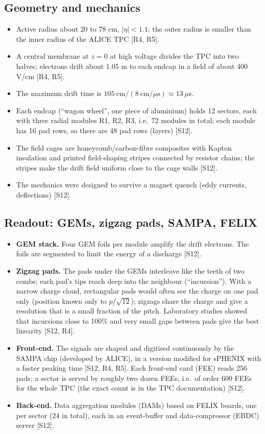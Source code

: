 \documentclass[11pt,letterpaper]{article}
\begin{document}
\subsection{Geometry and mechanics}
\begin{itemize}
\item Active radius about 20 to 78 cm, $|\eta|<1.1$; the outer radius is smaller than the inner radius of the ALICE TPC [R4, R5].
\item A central membrane at $z=0$ at high voltage divides the TPC into two halves; electrons drift about 1.05 m to each endcap in a field of about 400 V/cm [R4, R5].
\item The maximum drift time is $105\ \mathrm{cm}/(8\ \mathrm{cm}/\mu\mathrm{s})\approx13\ \mu$s.
\item Each endcap (``wagon wheel'', one piece of aluminium) holds 12 sectors, each with three radial modules R1, R2, R3, i.e.\ 72 modules in total; each module has 16 pad rows, so there are 48 pad rows (layers) [S12].
\item The field cages are honeycomb/carbon-fibre composites with Kapton insulation and printed field-shaping stripes connected by resistor chains; the stripes make the drift field uniform close to the cage walls [S12].
\item The mechanics were designed to survive a magnet quench (eddy currents, deflections) [S12].
\end{itemize}

\subsection{Readout: GEMs, zigzag pads, SAMPA, FELIX}
\begin{itemize}
\item \textbf{GEM stack.} Four GEM foils per module amplify the drift electrons. The foils are segmented to limit the energy of a discharge [S12].
\item \textbf{Zigzag pads.} The pads under the GEMs interleave like the teeth of two combs; each pad's tips reach deep into the neighbour (``incursion''). With a narrow charge cloud, rectangular pads would often see the charge on one pad only (position known only to $p/\sqrt{12}$); zigzags share the charge and give a resolution that is a small fraction of the pitch. Laboratory studies showed that incursions close to 100\% and very small gaps between pads give the best linearity [S12, R4].
\item \textbf{Front-end.} The signals are shaped and digitised continuously by the SAMPA chip (developed by ALICE), in a version modified for sPHENIX with a faster peaking time [S12, R4, R5]. Each front-end card (FEE) reads 256 pads; a sector is served by roughly two dozen FEEs, i.e.\ of order 600 FEEs for the whole TPC (the exact count is in the TPC documentation) [S12].
\item \textbf{Back-end.} Data aggregation modules (DAMs) based on FELIX boards, one per sector (24 in total), each in an event-buffer and data-compressor (EBDC) server [S12].
\end{itemize}
\end{document}
